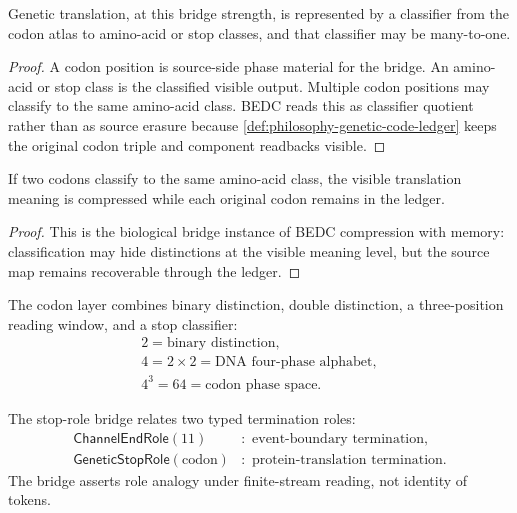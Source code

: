\begin{theorem}
\label{thm:philosophy-translation-classifier-quotient}
Genetic translation, at this bridge strength, is represented by a
classifier from the codon atlas to amino-acid or stop classes, and that
classifier may be many-to-one.
\end{theorem}
\begin{proof}
A codon position is source-side phase material for the bridge. An
amino-acid or stop class is the classified visible output. Multiple
codon positions may classify to the same amino-acid class. BEDC reads
this as classifier quotient rather than as source erasure because
\autoref{def:philosophy-genetic-code-ledger} keeps the original codon
triple and component readbacks visible.
\end{proof}

\begin{corollary}
\label{cor:philosophy-synonymous-codons-ledger-compression}
If two codons classify to the same amino-acid class, the visible
translation meaning is compressed while each original codon remains in
the ledger.
\end{corollary}
\begin{proof}
This is the biological bridge instance of BEDC compression with memory:
classification may hide distinctions at the visible meaning level, but
the source map remains recoverable through the ledger.
\end{proof}

\begin{corollary}
\label{cor:philosophy-codon-length-alphabet-size}
The codon layer combines binary distinction, double distinction, a
three-position reading window, and a stop classifier:
$$
\begin{gathered}
  2=\text{binary distinction},\\
  4=2\times 2=\text{DNA four-phase alphabet},\\
  4^{3}=64=\text{codon phase space}.
\end{gathered}
$$
\end{corollary}

\begin{definition}
\label{def:philosophy-stop-role-bridge}
The stop-role bridge relates two typed termination roles:
$$
\begin{aligned}
  \mathsf{ChannelEndRole}(11)
  &:\text{ event-boundary termination},\\
  \mathsf{GeneticStopRole}(\mathrm{codon})
  &:\text{ protein-translation termination}.
\end{aligned}
$$
The bridge asserts role analogy under finite-stream reading, not
identity of tokens.
\end{definition}

